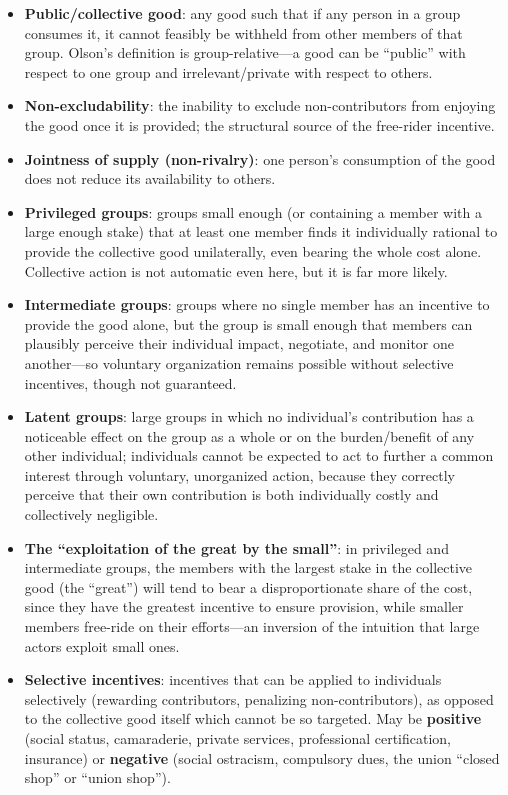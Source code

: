 \documentclass[12pt]{article}
\begin{document}
\begin{itemize}[leftmargin=*, itemsep=4pt]
    \item \textbf{Public/collective good}: any good such that if any person in a group consumes it, it cannot feasibly be withheld from other members of that group. Olson's definition is group-relative---a good can be ``public'' with respect to one group and irrelevant/private with respect to others.
    \item \textbf{Non-excludability}: the inability to exclude non-contributors from enjoying the good once it is provided; the structural source of the free-rider incentive.
    \item \textbf{Jointness of supply (non-rivalry)}: one person's consumption of the good does not reduce its availability to others.
    \item \textbf{Privileged groups}: groups small enough (or containing a member with a large enough stake) that at least one member finds it individually rational to provide the collective good unilaterally, even bearing the whole cost alone. Collective action is not automatic even here, but it is far more likely.
    \item \textbf{Intermediate groups}: groups where no single member has an incentive to provide the good alone, but the group is small enough that members can plausibly perceive their individual impact, negotiate, and monitor one another---so voluntary organization remains possible without selective incentives, though not guaranteed.
    \item \textbf{Latent groups}: large groups in which no individual's contribution has a noticeable effect on the group as a whole or on the burden/benefit of any other individual; individuals cannot be expected to act to further a common interest through voluntary, unorganized action, because they correctly perceive that their own contribution is both individually costly and collectively negligible.
    \item \textbf{The ``exploitation of the great by the small''}: in privileged and intermediate groups, the members with the largest stake in the collective good (the ``great'') will tend to bear a disproportionate share of the cost, since they have the greatest incentive to ensure provision, while smaller members free-ride on their efforts---an inversion of the intuition that large actors exploit small ones.
    \item \textbf{Selective incentives}: incentives that can be applied to individuals selectively (rewarding contributors, penalizing non-contributors), as opposed to the collective good itself which cannot be so targeted. May be \textbf{positive} (social status, camaraderie, private services, professional certification, insurance) or \textbf{negative} (social ostracism, compulsory dues, the union ``closed shop'' or ``union shop'').

\end{itemize}
\end{document}
